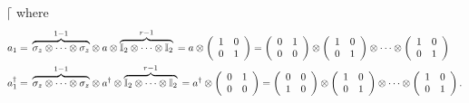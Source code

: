 \documentclass[aps,preprint]{revtex4}%
\begin{document}
$\lceil$ where
\begin{align}
a_{1}  &  =\,\overset{1-1}{\overbrace{\mathbb{\sigma}_{z}\otimes\cdots
\otimes\mathbb{\sigma}_{z}}}\otimes a\otimes
\overset{r-1}{\overbrace{\mathbb{I}_{2}\otimes\cdots\otimes\mathbb{I}_{2}}%
}\,=a\otimes\left(
\begin{array}
[c]{cc}%
1 & 0\\
0 & 1
\end{array}
\right)  =\left(
\begin{array}
[c]{cc}%
0 & 1\\
0 & 0
\end{array}
\right)  \otimes\left(
\begin{array}
[c]{cc}%
1 & 0\\
0 & 1
\end{array}
\right)  \otimes\cdots\otimes\left(
\begin{array}
[c]{cc}%
1 & 0\\
0 & 1
\end{array}
\right) \\
a_{1}^{\dagger}  &  =\,\overset{1-1}{\overbrace{\mathbb{\sigma}_{z}%
\otimes\cdots\otimes\mathbb{\sigma}_{z}}}\otimes a^{\dagger}\otimes
\overset{r-1}{\overbrace{\mathbb{I}_{2}\otimes\cdots\otimes\mathbb{I}_{2}}%
}\,=a^{\dagger}\otimes\left(
\begin{array}
[c]{cc}%
0 & 1\\
0 & 0
\end{array}
\right)  =\left(
\begin{array}
[c]{cc}%
0 & 0\\
1 & 0
\end{array}
\right)  \otimes\left(
\begin{array}
[c]{cc}%
1 & 0\\
0 & 1
\end{array}
\right)  \otimes\cdots\otimes\left(
\begin{array}
[c]{cc}%
1 & 0\\
0 & 1
\end{array}
\right)  .
\end{align}%
\end{document}
